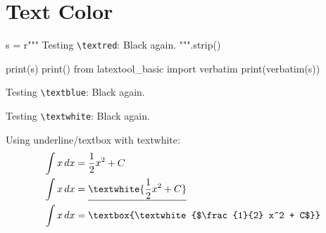 \section{Text Color}

\begin{python}
s = r"""
Testing \verb!\textred!:
Black again.
""".strip()

print(s)
print()
from latextool_basic import verbatim
print(verbatim(s))
\end{python}

Testing \verb!\textblue!:
Black again.

Testing \verb!\textwhite!:
Black again.

Using underline/textbox with textwhite:
\begin{align*}
\int x \, dx &= \frac{1}{2} x^2 + C \\
\int x \, dx &= \underline{\textwhite{\frac{1}{2} x^2 + C}} \\
\int x \, dx &= \text{\textbox{\textwhite{$\frac{1}{2} x^2 + C$}}}
\end{align*}
